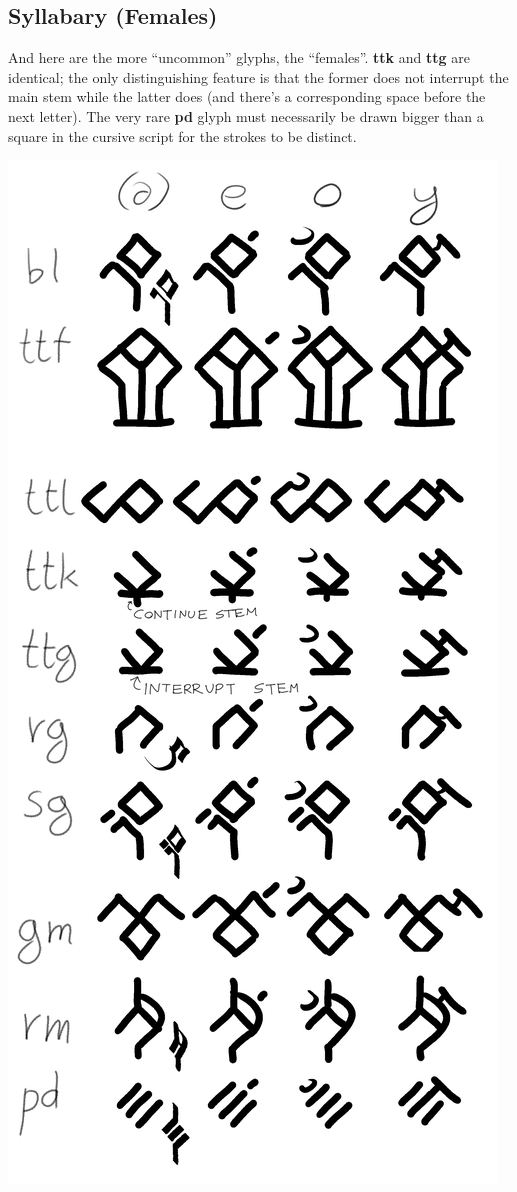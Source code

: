 \documentclass[10pt,oneside]{memoir}
\begin{document}
\begin{samepage}

\section{Syllabary (Females)}
    And here are the more ``uncommon'' glyphs, the ``females''. \textbf{ttk} and \textbf{ttg} are identical; the only distinguishing feature is that the former does not interrupt the main stem while the latter does (and there's a corresponding space before the next letter). The very rare \textbf{pd} glyph must necessarily be drawn bigger than a square in the cursive script for the strokes to be distinct.
\
\begin{center}
    \includegraphics[scale=0.60]{syllabary_females}
\end{center}

\end{samepage}
\end{document}
